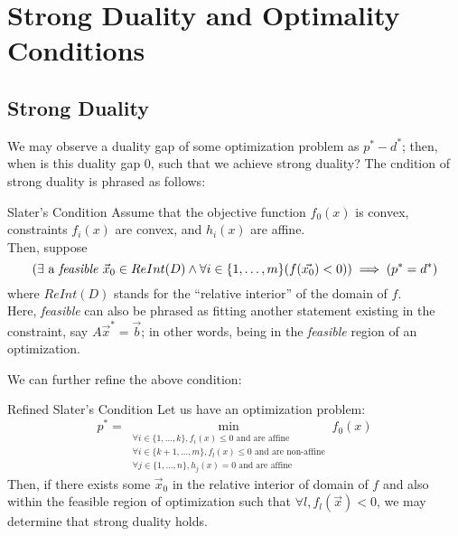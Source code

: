 \chapter{Strong Duality and Optimality Conditions}

\section{Strong Duality}
We may observe a duality gap of some optimization problem as $p^* - d^*$; then, when is this duality gap $0$, such that we achieve strong duality?
The cndition of strong duality is phrased as follows:
\begin{ln-define}{Slater's Condition}{}
    Assume that the objective function $f_0 (x)$ is convex, constraints $f_i(x)$ are convex, and $h_i(x)$ are affine. \\
    Then, suppose
    \[
        (\exists \text{ a \textit{feasible} }\vec{x}_0 \in ReInt(D) \land \forall i \in \{1, \dots, m\} (f({\vec{x_0}}) < 0)) \implies (p^* = d^*)
    \]
    where $ReInt(D)$ stands for the ``relative interior'' of the domain of $f$. \\
    Here, \textit{feasible} can also be phrased as fitting another statement existing in the constraint, say $A \vec{x}^* = \vec{b}$; in other words, being in the \textit{feasible} region of an optimization.
\end{ln-define}
We can further refine the above condition:
\begin{ln-define}{Refined Slater's Condition}{}
    Let us have an optimization problem:
    \[
        p^* = \min_{
            \substack{
                \forall i \in \{1, \dots, k\}, f_i(x) \leq 0 \text{ and are affine} \\
                \forall i \in \{k + 1, \dots, m\}, f_l(x) \leq 0 \text{ and are non-affine} \\
                \forall j \in \{1, \dots, n\}, h_j(x) = 0 \text{ and are affine}
            }
        } f_0 (x)
    \]
    Then, if there exists some $\vec{x}_0$ in the relative interior of domain of $f$ and also within the feasible region of optimization such that $\forall l, f_l (\vec{x}) < 0$, we may determine that strong duality holds.
\end{ln-define}

